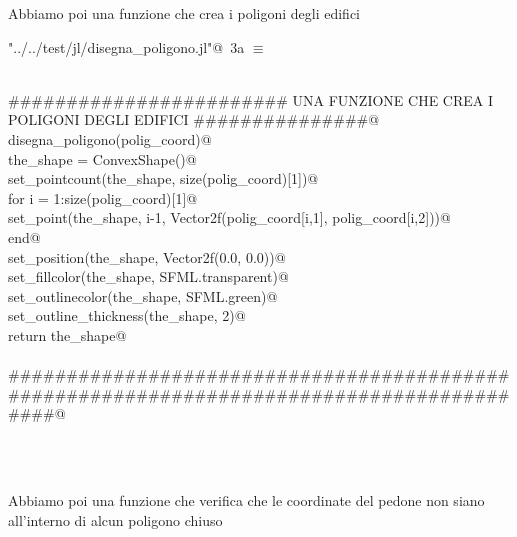 \documentclass[]{article}
\begin{document}
Abbiamo poi una funzione che crea i poligoni degli edifici
\begin{flushleft} \small
\begin{minipage}{\linewidth} \label{scrap4}
\protect{}\verb@"../../test/jl/disegna_poligono.jl"@\nobreak\ {\footnotesize 3a }$\equiv$
\vspace{-1ex}
\begin{list}{}{} \item
\mbox{}\verb@@\\
\mbox{}\verb@######################## UNA FUNZIONE CHE CREA I POLIGONI DEGLI EDIFICI ###############@\\
\mbox{}\verb@function disegna_poligono(polig_coord)@\\
\mbox{}\verb@   the_shape = ConvexShape()@\\
\mbox{}\verb@   set_pointcount(the_shape, size(polig_coord)[1])@\\
\mbox{}\verb@   for i = 1:size(polig_coord)[1]@\\
\mbox{}\verb@      set_point(the_shape, i-1, Vector2f(polig_coord[i,1], polig_coord[i,2]))@\\
\mbox{}\verb@   end@\\
\mbox{}\verb@   set_position(the_shape, Vector2f(0.0, 0.0))@\\
\mbox{}\verb@   set_fillcolor(the_shape, SFML.transparent)@\\
\mbox{}\verb@   set_outlinecolor(the_shape, SFML.green)@\\
\mbox{}\verb@   set_outline_thickness(the_shape, 2)@\\
\mbox{}\verb@   return the_shape@\\
\mbox{}\verb@end@\\
\mbox{}\verb@##########################################################################################@\\
\mbox{}\verb@@\\
\mbox{}\verb@@{\NWsep}
\end{list}
\vspace{-2ex}
\end{minipage}\\[4ex]
\end{flushleft}
Abbiamo poi una funzione che verifica che le coordinate del pedone non siano all'interno di alcun poligono chiuso
\end{document}
